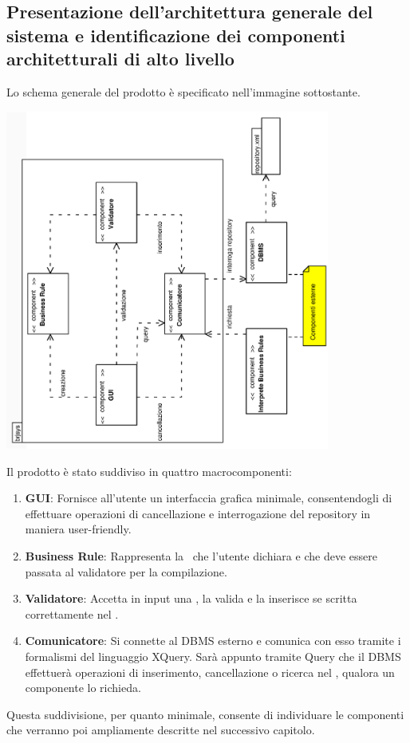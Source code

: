 \documentclass[11pt,titlepage,a4paper]{report}
\begin{document}
\subsection{Presentazione dell'architettura generale del sistema e identificazione dei componenti architetturali di alto livello}
Lo schema generale del prodotto \`e specificato nell'immagine sottostante.
\begin{center}
\includegraphics[width=0.8\textwidth, angle=-90]{DiagrammaClassi/schemagenerale.eps}
\end{center}
Il prodotto \`e stato suddiviso in quattro macrocomponenti:
\begin{enumerate}
 \item \textbf{GUI}: Fornisce all'utente un interfaccia grafica minimale, consentendogli di effettuare operazioni di cancellazione e interrogazione del repository in maniera user-friendly.
\item \textbf{Business Rule}: Rappresenta la \br\ che l'utente dichiara e che deve essere passata al validatore per la compilazione.
\item \textbf{Validatore}: Accetta in input una \br, la valida e la inserisce se scritta correttamente nel \re.
\item \textbf{Comunicatore}: Si connette al DBMS esterno e comunica con esso tramite i formalismi del linguaggio XQuery.
Sar\`a appunto tramite Query che il DBMS effettuer\`a operazioni di inserimento, cancellazione o ricerca nel \re, qualora un componente lo richieda.
\end{enumerate}
Questa suddivisione, per quanto minimale, consente di individuare le componenti che verranno poi ampliamente descritte nel successivo capitolo.
\end{document}
